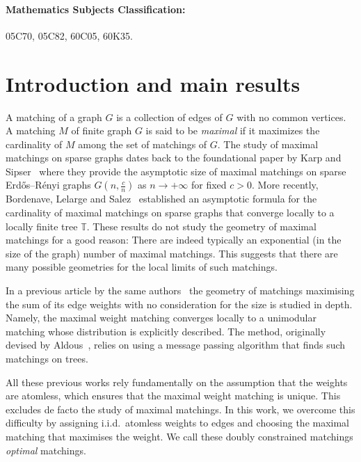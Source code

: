 \documentclass[11pt]{article}
\begin{document}
\paragraph{Mathematics Subjects Classification:} 05C70, 05C82, 60C05, 60K35.

\vfill

\newpage

\tableofcontents

\newpage

\section{Introduction and main results}

A matching of a graph $G$ is a collection of edges of $G$ with no common vertices. A matching $M$ of finite graph $G$ is said to be \textit{maximal} if it maximizes the cardinality of $M$ among the set of matchings of $G$.
The study of maximal matchings on sparse graphs dates back to the foundational paper by Karp and Sipser~\cite{Karp} where they provide the asymptotic size of maximal matchings on sparse Erdős–Rényi graphs $G(n,\frac{c}{n})$ as $n \rightarrow +\infty$ for fixed $c>0$. More recently, Bordenave, Lelarge and Salez~\cite{bordenave2012matchings} established an asymptotic formula for the cardinality of maximal matchings on sparse graphs that converge locally to a locally finite tree $\mathbb T$. These results do not study the geometry of maximal matchings for a good reason: There are indeed typically an exponential (in the size of the graph) number of maximal matchings. This suggests that there are many possible geometries for the local limits of such matchings.


In a previous article by the same authors~\cite{enriquez2024optimalunimodularmatching} the geometry of matchings maximising the sum of its edge weights with no consideration for the size is studied in depth. Namely, the maximal weight matching converges locally to a unimodular matching whose distribution is explicitly described. The method, originally devised by Aldous~\cite{aldous2000zeta2,Aldous1992AsymptoticsIT}, relies on using a message passing algorithm that finds such matchings on trees.

All these previous works rely fundamentally on the assumption that the weights are atomless, which ensures that the maximal weight matching is unique. This excludes de facto the study of maximal matchings.
In this work, we overcome this difficulty by assigning i.i.d.~atomless weights to edges and choosing the maximal matching that maximises the weight. We call these doubly constrained matchings \emph{optimal} matchings.
\end{document}
